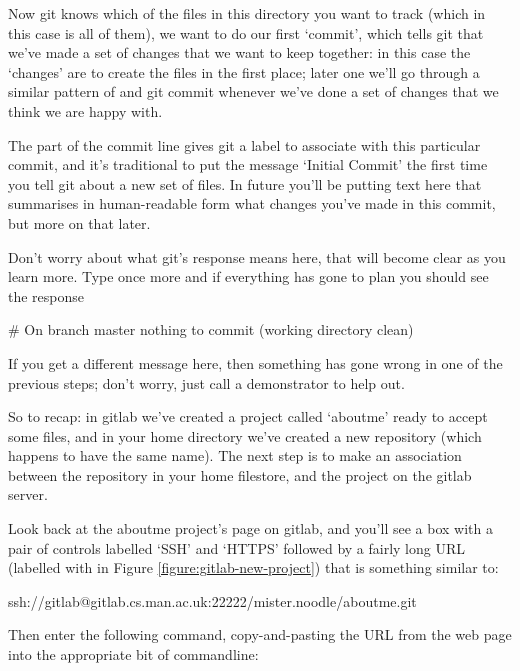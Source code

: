 Now git knows which of the files in this directory you want to track (which in this case is all of them), we want to do our first `commit', which tells git that we've made a set of changes that we want to keep together: in this case the `changes' are to create the files in the first place; later one we'll go through a similar pattern of  and {git commit} whenever we've done a set of changes that we think we are happy with. 

The  part of the commit line gives git a label to associate with this particular commit, and it's traditional to put the message `Initial Commit' the first time you tell git about a new set of files. In future you'll be putting text here that summarises in human-readable form what changes you've made in this commit, but more on that later.


Don't worry about what git's response means here, that will become clear as you learn more. Type  once more and if everything has gone to plan you should see the response

\begin{ttoutenv}
# On branch master
nothing to commit (working directory clean)
\end{ttoutenv}

If you get a different message here, then something has gone wrong in one of the previous steps; don't worry, just call a demonstrator to help out. 

So to recap: in gitlab we've created a project called `aboutme' ready to accept some files, and in your home directory we've created a new repository (which happens to have the same name). The next step is to make an association between the repository in your home filestore, and the project on the gitlab server. 

Look back at the aboutme project's page on gitlab, and you'll see a box with a pair of controls labelled `SSH' and `HTTPS' followed by a fairly long URL (labelled with \protect{} in Figure \ref{figure:gitlab-new-project}) that is something similar to:

\begin{ttoutenv}
ssh://gitlab@gitlab.cs.man.ac.uk:22222/mister.noodle/aboutme.git
\end{ttoutenv}

Then enter the following command, copy-and-pasting the URL from the web page into the appropriate bit of commandline:

